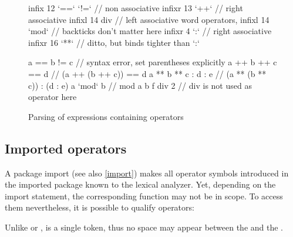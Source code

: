 \begin{figure}
\begin{code}

infix 12 `==` `!=`       // non associative
infixr 13 `++`           // right associative
infixl 14 div            // left associative word operators, 
infixl 14 `mod`          //  backticks don't matter here
infixr 4 `:`             // right associative
infixr 16 `**`           // ditto, but binds tighter than `:`

a == b != c              // syntax error, set parentheses explicitly
a ++ b ++ c  == d        // (a ++ (b ++ c)) == d
a ** b ** c : d : e      // (a ** (b ** c)) : (d : e)
a `mod` b                // mod a b
f div 2                  // div is not used as operator here
\end{code}
\caption{Parsing of expressions containing operators} \label{exprparse}
\end{figure}

\subsection{Imported operators} \label{importedops}

A package import (see also \autoref{import}) makes all operator symbols introduced in the imported package known to the lexical analyzer. Yet, depending on the import statement, the corresponding function may not be in scope. To access them nevertheless, it is possible to qualify operators:

\begin{flushleft}
 
\end{flushleft}

Unlike  or ,  is a single token, thus no space may appear between the  and the .




